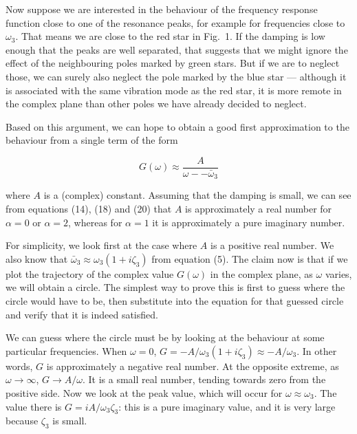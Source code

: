  Now suppose we are interested in the behaviour of the frequency response 
  function close to one of the resonance peaks, for example for frequencies 
  close to $\omega_3$. That means we are close to the red star in Fig.\ 1. If 
  the damping is low enough that the peaks are well separated, that suggests 
  that we might ignore the effect of the neighbouring poles marked by green 
  stars. But if we are to neglect those, we can surely also neglect the pole 
  marked by the blue star --- although it is associated with the same vibration 
  mode as the red star, it is more remote in the complex plane than other poles 
  we have already decided to neglect. 

  Based on this argument, we can hope to obtain a good first approximation to 
  the behaviour from a single term of the form 

  \begin{equation*}G(\omega) \approx \dfrac{A}{\omega -- \bar{\omega}_3} 
  \tag{21}\end{equation*} 

  \noindent{}where $A$ is a (complex) constant. Assuming that the damping is 
  small, we can see from equations (14), (18) and (20) that $A$ is 
  approximately a real number for $\alpha = 0$ or $\alpha = 2$, whereas for 
  $\alpha=1$ it is approximately a pure imaginary number. 

  For simplicity, we look first at the case where $A$ is a positive real 
  number. We also know that $\bar{\omega}_3 \approx \omega_3(1+i \zeta_3)$ from 
  equation (5). The claim now is that if we plot the trajectory of the complex 
  value $G(\omega)$ in the complex plane, as $\omega$ varies, we will obtain a 
  circle. The simplest way to prove this is first to guess where the circle 
  would have to be, then substitute into the equation for that guessed circle 
  and verify that it is indeed satisfied. 

  We can guess where the circle must be by looking at the behaviour at some 
  particular frequencies. When $\omega=0$, $G=-A/\omega_3(1+i \zeta_3) \approx 
  -A/\omega_3$. In other words, $G$ is approximately a negative real number. At 
  the opposite extreme, as $\omega \rightarrow\infty$, $G \rightarrow 
  A/\omega$. It is a small real number, tending towards zero from the positive 
  side. Now we look at the peak value, which will occur for $\omega \approx 
  \omega_3$. The value there is $G=iA/\omega_3 \zeta_3$: this is a pure 
  imaginary value, and it is very large because $\zeta_3$ is small. 

